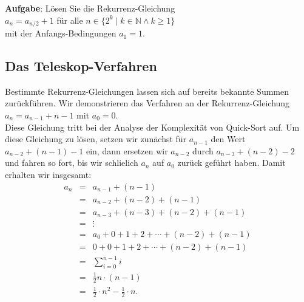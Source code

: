 \noindent
\textbf{Aufgabe}:  L\"{o}sen Sie die Rekurrenz-Gleichung \\[0.2cm]
\hspace*{1.3cm} $a_{n} = a_{n/2} + 1$ \quad f\"{u}r alle $n \in \{ 2^k \mid k \in \mathbb{N} \wedge k \geq 1\}$\\[0.2cm]
mit der Anfangs-Bedingungen $a_1 = 1$.
\vspace*{0.3cm}


\subsection{Das Teleskop-Verfahren}
Bestimmte Rekurrenz-Gleichungen lassen sich auf bereits bekannte Summen zur\"{u}ckf\"{u}hren.  Wir demonstrieren
das Verfahren an der Rekurrenz-Gleichung \\[0.2cm]
\hspace*{1.3cm} $a_n = a_{n-1} + n - 1$ \quad mit $a_0 = 0$. 
\\[0.2cm]
Diese Gleichung tritt bei der Analyse der Komplexit\"{a}t von Quick-Sort auf.
Um diese Gleichung zu l\"{o}sen, setzen wir zun\"{a}chst f\"{u}r $a_{n-1}$ den Wert $a_{n-2} + (n-1) - 1$ ein, dann 
ersetzen wir $a_{n-2}$ durch $a_{n-3} + (n-2) -2$ und fahren so fort, bis wir schlie\3lich $a_n$ auf $a_0$
zur\"{u}ck gef\"{u}hrt haben.
Damit erhalten wir insgesamt:
\[
\begin{array}{lcl}
  a_n & = & a_{n-1} + (n-1) \\
      & = & a_{n-2} + (n-2) + (n-1) \\
      & = & a_{n-3} + (n-3) + (n-2) + (n-1) \\
      & = & \vdots \\
      & = & a_{0} + 0 + 1 + 2 + \cdots  + (n-2) + (n-1) \\
      & = & 0 + 0 + 1 + 2 + \cdots  + (n-2) + (n-1) \\
      & = & \sum\limits_{i=0}^{n-1} i  \\[0.4cm]
      & = &  \frac{1}{2} n \cdot(n - 1) \\[0.2cm]
      & = & \frac{1}{2} \cdot n^2 - \frac{1}{2} \cdot n.
\end{array}
\]
